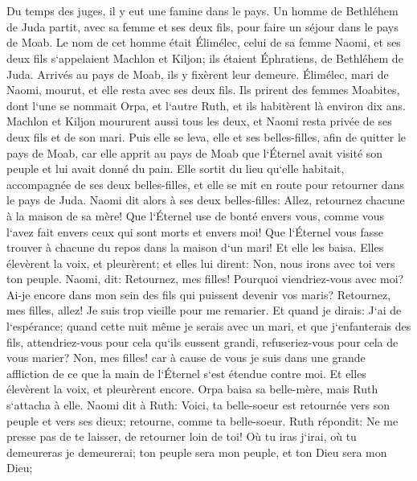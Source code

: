 

\chapter{}

\verse Du temps des juges, il y eut une famine dans le pays. Un homme de Bethléhem de Juda partit, avec sa femme et ses deux fils, pour faire un séjour dans le pays de Moab. 
\verse Le nom de cet homme était Élimélec, celui de sa femme Naomi, et ses deux fils s`appelaient Machlon et Kiljon; ils étaient Éphratiens, de Bethléhem de Juda. Arrivés au pays de Moab, ils y fixèrent leur demeure. 
\verse Élimélec, mari de Naomi, mourut, et elle resta avec ses deux fils. 
\verse Ils prirent des femmes Moabites, dont l`une se nommait Orpa, et l`autre Ruth, et ils habitèrent là environ dix ans. 
\verse Machlon et Kiljon moururent aussi tous les deux, et Naomi resta privée de ses deux fils et de son mari. 
\verse Puis elle se leva, elle et ses belles-filles, afin de quitter le pays de Moab, car elle apprit au pays de Moab que l`Éternel avait visité son peuple et lui avait donné du pain. 
\verse Elle sortit du lieu qu`elle habitait, accompagnée de ses deux belles-filles, et elle se mit en route pour retourner dans le pays de Juda. 
\verse Naomi dit alors à ses deux belles-filles: Allez, retournez chacune à la maison de sa mère! Que l`Éternel use de bonté envers vous, comme vous l`avez fait envers ceux qui sont morts et envers moi! 
\verse Que l`Éternel vous fasse trouver à chacune du repos dans la maison d`un mari! Et elle les baisa. Elles élevèrent la voix, et pleurèrent; 
\verse et elles lui dirent: Non, nous irons avec toi vers ton peuple. 
\verse Naomi, dit: Retournez, mes filles! Pourquoi viendriez-vous avec moi? Ai-je encore dans mon sein des fils qui puissent devenir vos maris? 
\verse Retournez, mes filles, allez! Je suis trop vieille pour me remarier. Et quand je dirais: J`ai de l`espérance; quand cette nuit même je serais avec un mari, et que j`enfanterais des fils, 
\verse attendriez-vous pour cela qu`ils eussent grandi, refuseriez-vous pour cela de vous marier? Non, mes filles! car à cause de vous je suis dans une grande affliction de ce que la main de l`Éternel s`est étendue contre moi. 
\verse Et elles élevèrent la voix, et pleurèrent encore. Orpa baisa sa belle-mère, mais Ruth s`attacha à elle. 
\verse Naomi dit à Ruth: Voici, ta belle-soeur est retournée vers son peuple et vers ses dieux; retourne, comme ta belle-soeur. 
\verse Ruth répondit: Ne me presse pas de te laisser, de retourner loin de toi! Où tu iras j`irai, où tu demeureras je demeurerai; ton peuple sera mon peuple, et ton Dieu sera mon Dieu; 
